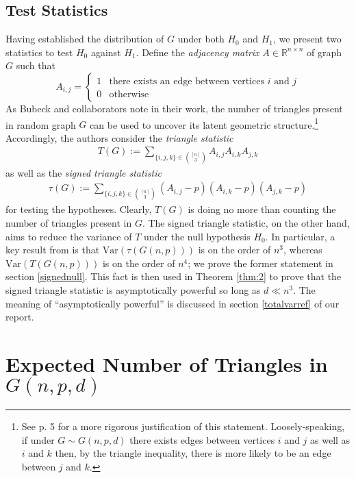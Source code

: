 \documentclass{article}
\begin{document}
\subsection{Test Statistics}\label{statref}
Having established the distribution of $G$ under both $H_0$ and $H_1$, we present two statistics to test $H_0$ against $H_1$. Define the \textit{adjacency matrix} $A \in \mathbb{R}^{n \times n}$ of graph $G$ such that
\[ A_{i, j} = \begin{cases} 
      1 & \text{there exists an edge between vertices $i$ and $j$} \\
      0 & \text{otherwise} 
   \end{cases}
\]
As Bubeck and collaborators note in their work, the number of triangles present in random graph $G$ can be used to uncover its latent geometric structure.\footnote{See p. 5 for a more rigorous justification of this statement. Loosely-speaking, if under $G \sim G(n,p,d)$ there exists edges between vertices $i$ and $j$ as well as $i$ and $k$ then, by the triangle inequality, there is more likely to be an edge between $j$ and $k$.} Accordingly, the authors consider the \textit{triangle statistic}
\begin{align}\label{trianglestat}
    T(G) := \sum\limits_{\{i,j,k\} \in \binom{[n]}{3}} A_{i,j} A_{i,k} A_{j,k}
\end{align}
as well as the \textit{signed triangle statistic}
\begin{align}\label{stat:signedt}
    \tau(G) := \sum\limits_{\{i,j,k\} \in \binom{[n]}{3}} (A_{i,j} - p)(A_{i,k} - p) (A_{j,k} - p)
\end{align}
for testing the hypotheses. Clearly, $T(G)$ is doing no more than counting the number of triangles present in $G$. The signed triangle statistic, on the other hand, aims to reduce the variance of $T$ under the null hypothesis $H_0$. In particular, a key result from \cite{bubeck2016testing} is that $\text{Var}(\tau(G(n,p)))$ is on the order of $n^3$, whereas $\text{Var}(T(G(n,p)))$ is on the order of $n^4$; we prove the former statement in section \ref{signednull}. This fact is then used in Theorem \ref{thm:2} to prove that the signed triangle statistic is asymptotically powerful so long as $d \ll n^3$. The meaning of \enquote{asymptotically powerful} is discussed in section \ref{totalvarref} of our report.

\section{Expected Number of Triangles in $G(n, p, d)$}\label{triangles}
\end{document}
